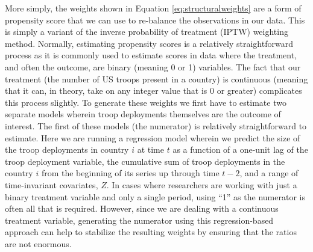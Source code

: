 		
		
		More simply, the weights shown in Equation \ref{eq:structuralweights} are a form of propensity score that we can use to re-balance the observations in our data. This is simply a variant of the inverse probability of treatment (IPTW) weighting method.\cite[For more information on estimating propensity scores see:][Chapter 13]{ImbensRubin2015} Normally, estimating propensity scores is a relatively straightforward process as it is commonly used to estimate scores in data where the treatment, and often the outcome, are binary (meaning 0 or 1) variables. The fact that our treatment (the number of US troops present in a country) is continuous (meaning that it can, in theory, take on any integer value that is 0 or greater) complicates this process slightly.\cite[For a fuller discussion of estimating the inverse probability of treatment weights for MSMs, estimating these weights for continuous treatment variables, or estimating weights for a continuous treatment in the presence of multilevel/grouped data using multilevel models see the following works:][]{ColeHernan2008,vanderwalGEskus2011,Naimietal2014,SchulerChuCoffman2016} To generate these weights we first have to estimate two separate models wherein troop deployments themselves are the outcome of interest. The first of these models (the numerator) is relatively straightforward to estimate. Here we are running a regression model wherein we predict the size of the troop deployments in country $i$ at time $t$ as a function of a one-unit lag of the troop deployment variable, the cumulative sum of troop deployments in the country $i$ from the beginning of its series up through time $t-2$, and a range of time-invariant covariates, $Z$. In cases where researchers are working with just a binary treatment variable and only a single period, using ``1'' as the numerator is often all that is required. However, since we are dealing with a continuous treatment variable, generating the numerator using this regression-based approach can help to stabilize the resulting weights by ensuring that the ratios are not enormous.\cite{ColeHernan2008}
		
